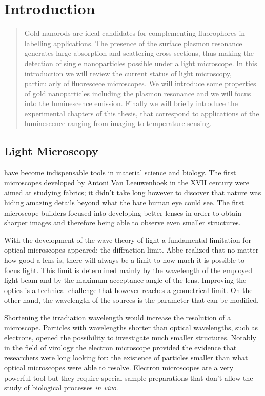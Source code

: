 \chapter{Introduction}
\label{introductions}

\begin{abstract}
Gold nanorods are ideal candidates for complementing fluorophores in labelling
applications. The presence of the surface plasmon resonance generates large
absorption and scattering cross sections, thus making the detection of single
nanoparticles possible under a light microscope. In this introduction we will
review the current status of light microscopy, particularly of fluorescece
microscopes. We will introduce some properties of gold nanoparticles including
the plasmon resonance and we will focus into the luminescence emission.
Finally we will briefly introduce the experimental chapters of this
thesis, that correspond to applications of the luminescence ranging from imaging to
temperature sensing.
\end{abstract}

\newpage

\section{Light Microscopy}
 have become indispensable tools in material science and
biology. The first microscopes developed by Antoni Van Leeuwenhoek in the XVII
century were aimed at studying fabrics; it didn't take long however to discover
that nature was hiding amazing details beyond what the bare human eye could
see. The first microscope builders focused into developing better lenses in
order to obtain sharper images and therefore being able to observe even smaller
structures. 

With the development of the wave theory of light a fundamental limitation for
optical microscopes appeared: the diffraction limit. Abbe realized that no
matter how good a lens is, there will always be a limit to how much it is
possible to focus light. This limit is determined mainly by the wavelength of
the employed light beam and by the maximum acceptance angle of the lens.
Improving the optics is a technical challenge that however reaches a
geometrical limit. On the other hand, the wavelength of the sources is the
parameter that can be modified.

Shortening the irradiation wavelength would increase the resolution of a
microscope. Particles with wavelengths shorter than optical wavelengths, such as
electrons, opened the possibility to investigate much smaller
structures\cite{Kausche1939}. Notably in the field of virology the electron
microscope provided the evidence that researchers were long looking for: the
existence of particles smaller than what optical microscopes were able to
resolve. Electron microscopes are a very powerful tool but they require special
sample preparations that don't allow the study of biological processes
\textit{in vivo}.

